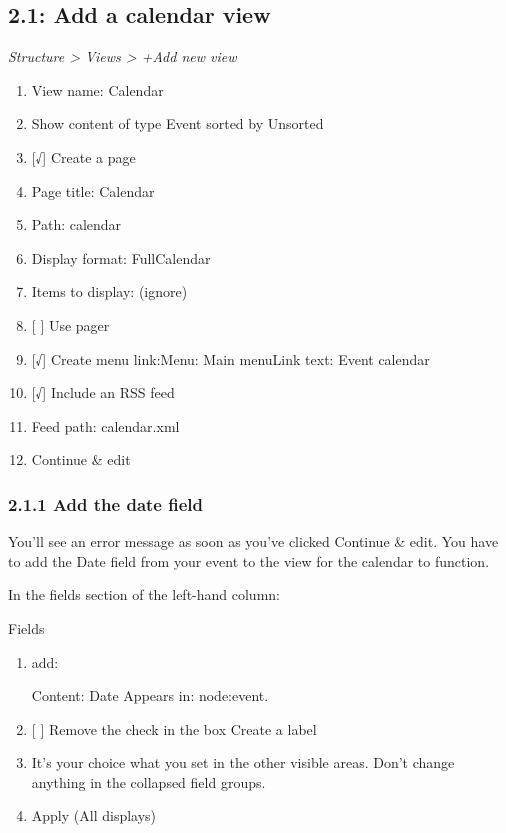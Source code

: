 \documentclass[letterpaper,10pt,english]{sphinxmanual}
\begin{document}
\subsection{2.1: Add a calendar view}
\label{event_calendar:add-a-calendar-view}
\emph{Structure \textgreater{} Views \textgreater{} +Add new view}
\begin{enumerate}
\item {} 
View name: Calendar

\item {} 
Show content of type Event sorted by Unsorted

\item {} 
{[}√{]} Create a page

\item {} 
Page title: Calendar

\item {} 
Path: calendar

\item {} 
Display format: FullCalendar

\item {} 
Items to display: (ignore)

\item {} 
{[}  {]} Use pager

\item {} 
{[}√{]} Create menu link:Menu: Main menuLink text: Event calendar

\item {} 
{[}√{]} Include an RSS feed

\item {} 
Feed path: calendar.xml

\item {} 
Continue \& edit

\end{enumerate}


\subsubsection{2.1.1 Add the date field}
\label{event_calendar:add-the-date-field}
You'll see an error message as soon as you've clicked Continue \& edit. You have to add the Date field from your event to the view for the calendar to function.

In the fields section of the left-hand column:

Fields
\begin{enumerate}
\item {} 
add:

Content: Date
Appears in: node:event.

\item {} 
{[} {]} Remove the check in the box Create a label

\item {} 
It's your choice what you set in the other visible areas. Don't change anything in the collapsed field groups.

\item {} 
Apply (All displays)

\end{enumerate}
\end{document}
